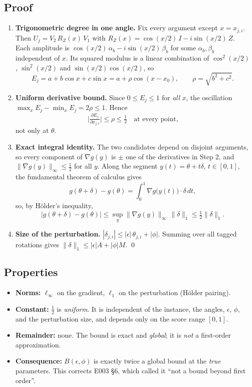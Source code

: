\documentclass[11pt,a4paper]{article}
\theoremstyle{plain}
\theoremstyle{definition}
\theoremstyle{remark}
\newcommand{\eps}{\epsilon}
\newcommand{\norm}[1]{\lVert #1\rVert}
\begin{document}
\subsection{Proof}
\begin{enumerate}[label=\textbf{Step \arabic*.},leftmargin=*,itemsep=4pt]
\item \textbf{Trigonometric degree in one angle.} Fix every argument except $x=x_{j,i}$. Then
$U_j=V_2\,R_Z(x)\,V_1$ with $R_Z(x)=\cos(x/2)\,I-i\sin(x/2)\,Z$. Each amplitude is
$\cos(x/2)\,\alpha_b-i\sin(x/2)\,\beta_b$ for some $\alpha_b,\beta_b$ independent of $x$. Its squared modulus is a linear
combination of $\cos^2(x/2)$, $\sin^2(x/2)$ and $\sin(x/2)\cos(x/2)$, so
\[
E_j = a+b\cos x+c\sin x = a + \rho\cos(x-x_0),\qquad \rho=\sqrt{b^2+c^2}.
\]
\item \textbf{Uniform derivative bound.} Since $0\le E_j\le1$ for \emph{all} $x$, the oscillation
$\max_x E_j-\min_x E_j = 2\rho \le 1$. Hence
\[
\Big|\tfrac{\partial E_j}{\partial x_{j,i}}\Big| \le \rho \le \tfrac12 \quad\text{at every point,}
\]
not only at $\theta$.
\item \textbf{Exact integral identity.} The two candidates depend on disjoint arguments, so every component of
$\nabla g(y)$ is $\pm$ one of the derivatives in Step 2, and $\norm{\nabla g(y)}_\infty\le\tfrac12$ for all $y$.
Along the segment $y(t)=\theta+t\delta$, $t\in[0,1]$, the fundamental theorem of calculus gives
\[
g(\theta+\delta)-g(\theta)=\int_0^1 \nabla g\big(y(t)\big)\cdot\delta\,dt,
\]
so, by H\"older's inequality,
\[
\big|g(\theta+\delta)-g(\theta)\big|\le \sup_y\norm{\nabla g(y)}_\infty\,\norm{\delta}_1 \le \tfrac12\norm{\delta}_1 .
\]
\item \textbf{Size of the perturbation.} $|\delta_{j,i}|\le|\eps|\,\theta_{j,i}+|\phi|$. Summing over all tagged rotations
gives $\norm{\delta}_1\le|\eps|A+|\phi|M$. \qed
\end{enumerate}

\subsection{Properties}
\begin{itemize}[leftmargin=*,itemsep=2pt]
\item \textbf{Norms:} $\ell_\infty$ on the gradient, $\ell_1$ on the perturbation (H\"older pairing).
\item \textbf{Constant:} $\tfrac12$ is \emph{uniform}. It is independent of the instance, the angles, $\eps$, $\phi$,
and the perturbation size, and depends only on the score range $[0,1]$.
\item \textbf{Remainder:} none. The bound is exact and \emph{global}; it is \emph{not} a first-order approximation.
\item \textbf{Consequence:} $B(\eps,\phi)$ is exactly twice a global bound at the \emph{true} parameters.
This corrects E003 \S6, which called it ``not a bound beyond first order''.
\end{itemize}
\end{document}
